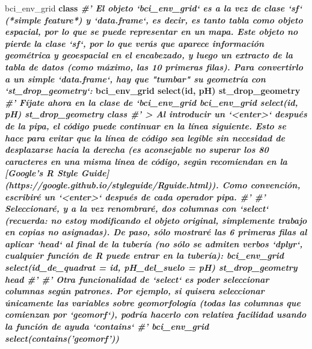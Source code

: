\documentclass[11pt,]{article}
\newenvironment{Shaded}{\begin{snugshade}}{\end{snugshade}}
\newcommand{\KeywordTok}[1]{\textcolor[rgb]{0.13,0.29,0.53}{\textbf{#1}}}
\newcommand{\DataTypeTok}[1]{\textcolor[rgb]{0.13,0.29,0.53}{#1}}
\newcommand{\StringTok}[1]{\textcolor[rgb]{0.31,0.60,0.02}{#1}}
\newcommand{\CommentTok}[1]{\textcolor[rgb]{0.56,0.35,0.01}{\textit{#1}}}
\newcommand{\OperatorTok}[1]{\textcolor[rgb]{0.81,0.36,0.00}{\textbf{#1}}}
\newcommand{\NormalTok}[1]{#1}
\begin{document}
\begin{Shaded}
\begin{Highlighting}[]
{{{{\NormalTok{bci_env_grid }\OperatorTok{%
\StringTok{  }\NormalTok{class}
\CommentTok{#' El objeto `bci_env_grid` es a la vez de clase `sf` (*simple feature*) y `data.frame`, es decir, es tanto tabla como objeto espacial, por lo que se puede representar en un mapa. Este objeto no pierde la clase `sf`, por lo que verás que aparece información geométrica y geoespacial en el encabezado, y luego un extracto de la tabla de datos (como máximo, las 10 primeras filas). Para convertirlo a un simple `data.frame`, hay que "tumbar" su geometría con `st_drop_geometry`:}
\NormalTok{bci_env_grid }\OperatorTok{%
\StringTok{  }\KeywordTok{select}\NormalTok{(id, pH) }\OperatorTok{%
\StringTok{  }\NormalTok{st_drop_geometry}
\CommentTok{#' Fíjate ahora en la clase de `bci_env_grid %
\NormalTok{bci_env_grid }\OperatorTok{%
\StringTok{  }\KeywordTok{select}\NormalTok{(id, pH) }\OperatorTok{%
\StringTok{  }\NormalTok{st_drop_geometry }\OperatorTok{%
\StringTok{  }\NormalTok{class}
\CommentTok{#' > Al introducir un `<enter>` después de la pipa, el código puede continuar en la línea siguiente. Esto se hace para evitar que la línea de código sea legible sin necesidad de desplazarse hacia la derecha (es aconsejable no superar los 80 caracteres en una misma línea de código, según recomiendan en la [Google’s R Style Guide](https://google.github.io/styleguide/Rguide.html)). Como convención, escribiré un `<enter>` después de cada operador pipa.}
\CommentTok{#' }
\CommentTok{#' Seleccionaré, y a la vez renombraré, dos columnas con `select` (recuerda: no estoy modificando el objeto original, simplemente trabajo en copias no asignadas). De paso, sólo mostraré las 6 primeras filas al aplicar `head` al final de la tubería (no sólo se admiten verbos `dplyr`, cualquier función de R puede entrar en la tubería):}
\NormalTok{bci_env_grid }\OperatorTok{%
\StringTok{  }\KeywordTok{select}\NormalTok{(}\DataTypeTok{id_de_quadrat =}\NormalTok{ id, }\DataTypeTok{pH_del_suelo =}\NormalTok{ pH) }\OperatorTok{%
\StringTok{  }\NormalTok{st_drop_geometry }\OperatorTok{%
\StringTok{  }\NormalTok{head}
\CommentTok{#' }
\CommentTok{#' Otra funcionalidad de `select` es poder seleccionar columnas según patrones. Por ejemplo, si quisera seleccionar únicamente las variables sobre geomorfología (todas las columnas que comienzan por `geomorf`), podría hacerlo con relativa facilidad usando la función de ayuda `contains`}
\CommentTok{#' }
\NormalTok{bci_env_grid }\OperatorTok{%
\StringTok{  }\KeywordTok{select}\NormalTok{(}\KeywordTok{contains}\NormalTok{(}\StringTok{'geomorf'}\NormalTok{)) }\OperatorTok{%
}}}}}}}}}}}}}}}}
\end{Highlighting}
\end{Shaded}
\end{document}
